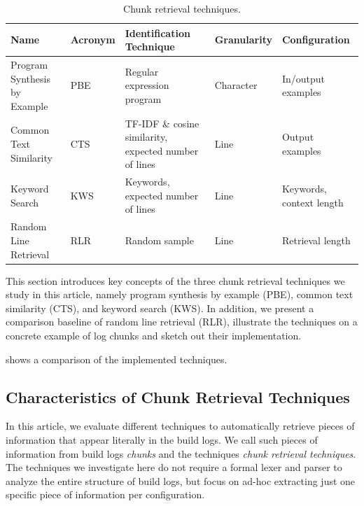 \begin{table}[htb]
\centering
\caption{Chunk retrieval techniques.}
\begin{tabularx}{\textwidth}{@{}llXll@{}}
\toprule
Name			     & Acronym & Identification Technique
& Granularity & Configuration \\
\midrule
Program Synthesis by Example & PBE     & Regular expression program
& Character   & In/output examples	\\
Common Text Similarity	     & CTS     & TF-IDF \& cosine similarity,
expected number of lines & Line        & Output examples	   \\
Keyword Search		     & KWS     & Keywords, expected number of
lines			 & Line        & Keywords, context length  \\
Random Line Retrieval	     & RLR     & Random sample
& Line	      & Retrieval length	  \\
\bottomrule
\end{tabularx}
\label{tab:ctr}
\end{table}

This section introduces key concepts of the three chunk retrieval
techniques we study in this article, namely program synthesis by
example (PBE), common text similarity (CTS), and keyword search (KWS).
In addition, we present a comparison baseline of random line
retrieval (RLR), illustrate the techniques on a concrete example
of log chunks and sketch out their implementation.

 shows a comparison of the implemented techniques.


\subsection{Characteristics of Chunk Retrieval Techniques}
\label{sec:crt-characteristics}
In this article, we evaluate different techniques to automatically
retrieve pieces of information that appear literally in the build
logs.
We call such pieces of information from build logs
\emph{chunks} and the techniques \emph{chunk retrieval techniques}.
The techniques we investigate here do not require a formal lexer and
parser to analyze the entire structure of build logs, but focus on
ad-hoc extracting just one specific piece of information per
configuration.

